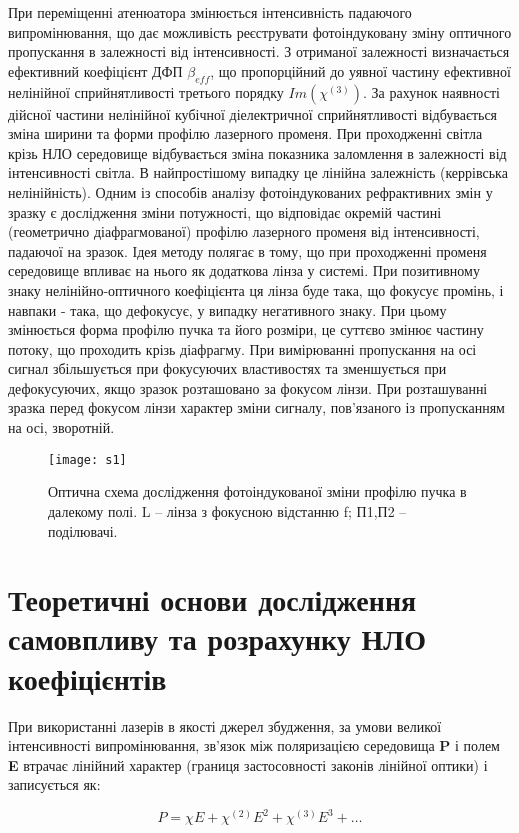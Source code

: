 При переміщенні атенюатора змінюється інтенсивність падаючого
випромінювання, що дає можливість реєструвати фотоіндуковану зміну оптичного
пропускання в залежності від інтенсивності. З отриманої залежності визначається
ефективний коефіцієнт ДФП $\beta_{eff}$, що пропорційний до уявної частину ефективної
нелінійної сприйнятливості третього порядку $Im(\chi^{(3)})$.
За рахунок наявності дійсної частини нелінійної кубічної діелектричної
сприйнятливості відбувається зміна ширини та форми профілю лазерного променя.
При проходженні світла крізь НЛО середовище відбувається зміна показника
заломлення в залежності від інтенсивності світла. В найпростішому випадку це
лінійна залежність (керрівська нелінійність).
Одним із способів аналізу фотоіндукованих рефрактивних змін у зразку є
дослідження зміни потужності, що відповідає окремій
частині (геометрично
діафрагмованої) профілю лазерного променя від інтенсивності, падаючої на зразок.
Ідея методу полягає в тому, що при проходженні променя середовище впливає на
нього як додаткова лінза у системі. При позитивному знаку нелінійно-оптичного
коефіцієнта ця лінза буде така, що фокусує промінь, і навпаки - така, що дефокусує,
у випадку негативного знаку. При цьому змінюється форма профілю пучка та його
розміри, це суттєво змінює частину потоку, що проходить крізь діафрагму. При
вимірюванні пропускання на осі сигнал збільшується при фокусуючих властивостях
та зменшується при дефокусуючих, якщо зразок розташовано за фокусом лінзи. При
розташуванні зразка перед фокусом лінзи характер зміни сигналу, пов’язаного із
пропусканням на осі, зворотній.

\begin{figure}
\centering
\texttt{[image: s1]}
\caption{Оптична схема дослідження фотоіндукованої зміни профілю
пучка в далекому полі. L -- лінза з фокусною відстанню f; П1,П2 -- поділювачі.}\label{fig:s1}
\end{figure}


\section{Теоретичні основи дослідження самовпливу та розрахунку НЛО коефіцієнтів }\label{sec:T_NLO}

При використанні лазерів в якості джерел збудження, за умови великої
інтенсивності випромінювання, зв’язок між поляризацією середовища \textbf{P} і
полем \textbf{E} втрачає лінійний характер (границя застосовності законів лінійної
оптики) і записується як:

\begin{equation}\label{eq:P_main}
P = \chi E + \chi^{(2)} E^2 + \chi^{(3)} E^3 + \dots 
\end{equation}


